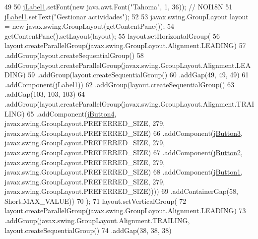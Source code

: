 \begin{DoxyCode}
49 
50         \mbox{\hyperlink{classinterfacessoguar_1_1_c_u0104_ad186ee919c545c2a04b7d0e7099a4e11}{jLabel1}}.setFont(\textcolor{keyword}{new} java.awt.Font(\textcolor{stringliteral}{"Tahoma"}, 1, 36)); \textcolor{comment}{// NOI18N}
51         \mbox{\hyperlink{classinterfacessoguar_1_1_c_u0104_ad186ee919c545c2a04b7d0e7099a4e11}{jLabel1}}.setText(\textcolor{stringliteral}{"Gestionar actividades"});
52 
53         javax.swing.GroupLayout layout = \textcolor{keyword}{new} javax.swing.GroupLayout(getContentPane());
54         getContentPane().setLayout(layout);
55         layout.setHorizontalGroup(
56             layout.createParallelGroup(javax.swing.GroupLayout.Alignment.LEADING)
57             .addGroup(layout.createSequentialGroup()
58                 .addGroup(layout.createParallelGroup(javax.swing.GroupLayout.Alignment.LEADING)
59                     .addGroup(layout.createSequentialGroup()
60                         .addGap(49, 49, 49)
61                         .addComponent(\mbox{\hyperlink{classinterfacessoguar_1_1_c_u0104_ad186ee919c545c2a04b7d0e7099a4e11}{jLabel1}}))
62                     .addGroup(layout.createSequentialGroup()
63                         .addGap(103, 103, 103)
64                         .addGroup(layout.createParallelGroup(javax.swing.GroupLayout.Alignment.TRAILING)
65                             .addComponent(\mbox{\hyperlink{classinterfacessoguar_1_1_c_u0104_a6330c8387302eb22ad8266154cae3b6a}{jButton4}}, javax.swing.GroupLayout.PREFERRED\_SIZE, 279, 
      javax.swing.GroupLayout.PREFERRED\_SIZE)
66                             .addComponent(\mbox{\hyperlink{classinterfacessoguar_1_1_c_u0104_a54322417464e03c0282783a3b1655cfd}{jButton3}}, javax.swing.GroupLayout.PREFERRED\_SIZE, 279, 
      javax.swing.GroupLayout.PREFERRED\_SIZE)
67                             .addComponent(\mbox{\hyperlink{classinterfacessoguar_1_1_c_u0104_a6cf10544c20d2e068ba50f9d6e620c6b}{jButton2}}, javax.swing.GroupLayout.PREFERRED\_SIZE, 279, 
      javax.swing.GroupLayout.PREFERRED\_SIZE)
68                             .addComponent(\mbox{\hyperlink{classinterfacessoguar_1_1_c_u0104_a14ee464c46b5f60fbf5f0a5788fd04a8}{jButton1}}, javax.swing.GroupLayout.PREFERRED\_SIZE, 279, 
      javax.swing.GroupLayout.PREFERRED\_SIZE))))
69                 .addContainerGap(58, Short.MAX\_VALUE))
70         );
71         layout.setVerticalGroup(
72             layout.createParallelGroup(javax.swing.GroupLayout.Alignment.LEADING)
73             .addGroup(javax.swing.GroupLayout.Alignment.TRAILING, layout.createSequentialGroup()
74                 .addGap(38, 38, 38)

\end{DoxyCode}
